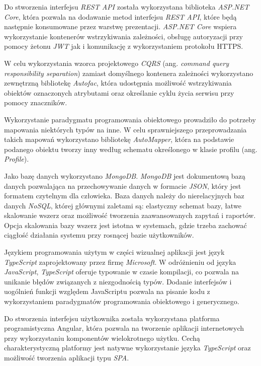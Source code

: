 \documentclass[a4paper,twoside,12pt]{book}
\newcommand{\obcy}[1]{\emph{#1}}
\newcommand{\ang}[1]{{\selectlanguage{british}\obcy{#1}}}
\begin{document}
Do stworzenia interfejsu \textit{REST API} została wykorzystana biblioteka \textit{ASP.NET Core}, która pozwala na dodawanie metod interfejsu \textit{REST API}, które będą następnie konsumowane przez warstwę prezentacji. \textit{ASP.NET Core} wspiera wykorzystanie kontenerów wstrzykiwania zależności, obsługę autoryzacji przy pomocy żetonu \textit{JWT} jak i komunikację z wykorzystaniem protokołu HTTPS\cite{bib:asp}.

W celu wykorzystania wzorca projektowego \textit{CQRS} (ang. \ang{command query responsibility separation}) zamiast domyślnego kontenera zależności wykorzystano zewnętrzną bibliotekę \textit{Autofac}, która udostępnia możliwość wstrzykiwania obiektów oznaczonych atrybutami oraz określanie cyklu życia serwisu przy pomocy znaczników\cite{bib:autofactag}.

Wykorzystanie paradygmatu programowania obiektowego prowadziło do potrzeby mapowania niektórych typów na inne. W celu sprawniejszego przeprowadzania takich mapowań wykorzystano bibliotekę \textit{AutoMapper}, która na podstawie podanego obiektu tworzy inny według schematu określonego w klasie profilu (ang. \ang{Profile}).

Jako bazę danych wykorzystano \textit{MongoDB}. \textit{MongoDB} jest dokumentową bazą danych pozwalająca na przechowywanie danych w formacie \textit{JSON}, który jest formatem czytelnym dla człowieka. Baza danych należy do nierelacyjnych baz danych \textit{NoSQL}, której głównymi zaletami są: elastyczny schemat bazy, łatwe skalowanie wszerz oraz możliwość tworzenia zaawansowanych zapytań i raportów\cite{bib:mongodb_guide}. Opcja skalowania bazy wszerz jest istotna w systemach, gdzie trzeba zachować ciągłość działania systemu przy rosnącej bazie użytkowników.

Językiem programowania użytym w części wizualnej aplikacji jest język \textit{TypeScript} zaprojektowany przez firmę \textit{Microsoft}. W odróżnieniu od języka \textit{JavaScript}, \textit{TypeScript} oferuje typowanie w czasie kompilacji, co pozwala na unikanie błędów związanych z niezgodnością typów. Dodanie interfejsów i uogólnień funkcji względem JavaScriptu pozwala na pisanie kodu z wykorzystaniem paradygmatów programowania obiektowego i generycznego\cite{bib:typescript}.

Do stworzenia interfejsu użytkownika została wykorzystana platforma programistyczna Angular, która pozwala na tworzenie aplikacji internetowych przy wykorzystaniu komponentów wielokrotnego użytku. Cechą charakterystyczną platformy jest natywne wykorzystanie języka \textit{TypeScript} oraz możliwość tworzenia aplikacji typu \textit{SPA}\cite{bib:anuglar}\cite{bib:typescript}.
\end{document}
